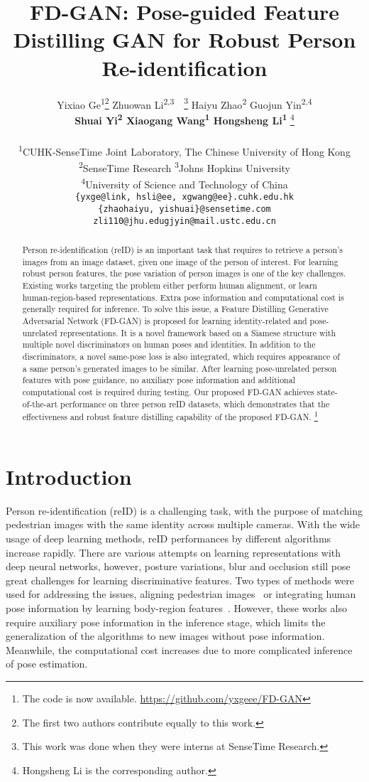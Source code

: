 \documentclass{article}
\title{FD-GAN: Pose-guided Feature Distilling GAN for Robust Person Re-identification}
\author{
  Yixiao Ge\textsuperscript{1}\thanks{The first two authors contribute equally to this work.}
  \qquad Zhuowan Li\textsuperscript{2,3}\footnotemark[1]~~\thanks{This work was done when they were interns at SenseTime Research.}
  \qquad Haiyu Zhao\textsuperscript{2}
  \qquad Guojun Yin\textsuperscript{2,4}\footnotemark[2]\\
  \qquad \textbf{Shuai Yi\textsuperscript{2}
  \qquad Xiaogang Wang\textsuperscript{1}
  \qquad Hongsheng Li\textsuperscript{1}} \thanks{Hongsheng Li is the corresponding author.}\\
  \\
   \textsuperscript{1}{CUHK-SenseTime Joint Laboratory, The Chinese University of Hong Kong}\\
	\textsuperscript{2}{SenseTime Research}\qquad
	\textsuperscript{3}{Johns Hopkins University}\\
	\textsuperscript{4}{University of Science and Technology of China}\\
	\texttt{\{yxge@link, hsli@ee, xgwang@ee\}.cuhk.edu.hk}\\
	\texttt{\{zhaohaiyu, yishuai\}@sensetime.com}\\
	\texttt{zli110@jhu.edu}\qquad\texttt{gjyin@mail.ustc.edu.cn}
}
\begin{document}
\maketitle

\begin{abstract}

Person re-identification (reID) is an important task that requires to retrieve a person's images from an image dataset, given one image of the person of interest. 
For learning robust person features, the pose variation of person images is one of the key challenges.
Existing works targeting the problem either perform human alignment, or learn human-region-based representations.
Extra pose information and computational cost is generally required for inference.
To solve this issue, a Feature Distilling Generative Adversarial Network (FD-GAN) is proposed for learning identity-related and pose-unrelated representations.
It is a novel framework based on a Siamese structure with multiple novel discriminators on human poses and identities.
In addition to the discriminators, a novel same-pose loss is also integrated, which requires appearance of a same person's generated images to be similar. After learning pose-unrelated person features with pose guidance, no auxiliary pose information and additional computational cost is required during testing.
Our proposed FD-GAN achieves state-of-the-art performance on three person reID datasets, which demonstrates that the effectiveness and robust feature distilling capability of the proposed FD-GAN. \footnote[9]{The code is now available. \href{https://github.com/yxgeee/FD-GAN}{https://github.com/yxgeee/FD-GAN}}

\end{abstract}
\section{Introduction}

Person re-identification (reID) is a challenging task, with the purpose of matching pedestrian images with the same identity across multiple cameras. 
With the wide usage of deep learning methods, reID performances by different algorithms increase rapidly. 
There are various attempts on learning representations with deep neural networks, however, posture variations, blur and occlusion still pose great challenges for learning discriminative features. 
Two types of methods were used for addressing the issues, aligning pedestrian images~\cite{zheng2017pedestrian} or integrating human pose information by learning body-region features~\cite{zhao2017spindle}.
However, these works also require auxiliary pose information in the inference stage, which limits the generalization of the algorithms to new images without pose information. 
Meanwhile, the computational cost increases due to more complicated inference of pose estimation.
\end{document}
